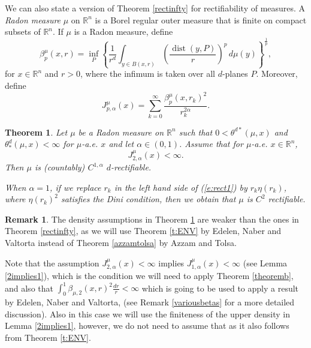 \documentclass[11pt, twoside, leqno]{article}
\numberwithin{equation}{section}
\theoremstyle{plain}
\newtheorem{thmz}{Theorem}
\theoremstyle{definition}
\newtheorem{rk}[thm]{Remark}
\newcommand{\R}{\mathbb{R}}
\newcommand{\dist}{\operatorname{dist}}
\begin{document}
We can also state a version of Theorem \ref{rectinfty} for rectifiability of measures. A \emph{Radon measure} $\mu$ on $\R^n$ is a Borel regular outer measure that is finite on compact subsets of $\R^n$.
If $\mu$ is a Radon measure, define
\begin{equation}
\beta_p^{\mu}(x,r)=\inf_P\left\{\frac{1}{r^d} \int_{y \in B(x,r)} \left(\frac{\dist(y,P)}{r}\right)^p\,d\mu(y)\right\}^{\frac{1}{p}},
\end{equation}
for $x \in \R^n$ and $r>0$, where the infimum is taken over all $d$-planes $P$.
Moreover, define
\begin{equation}
J^{\mu}_{p, \alpha}(x)= \sum_{k=0}^{\infty}\frac{\beta_p^{\mu}(x,r_k)^2}{r_k^{2\alpha}}.
\end{equation}


\begin{thmz} \label{rect1}
Let $\mu$ be a Radon measure on $\R^n$ such that $0< \theta^{d *}(\mu,x)$ and $\theta_*^d({\mu},x) <\infty$ for $\mu$-a.e. $x$ and let $\alpha\in (0,1)$. Assume that for $\mu$-a.e. $x \in \R^n$,
\begin{equation} \label{e:rect1}
J^{\mu}_{2,\alpha}(x) < \infty.
\end{equation}
Then $\mu$ is (countably) $C^{1,\alpha}$ $d$-rectifiable. 

When $\alpha=1$, if we replace $r_k$ in the left hand side of (\ref{e:rect1}) by $r_k\eta(r_k)$, where $\eta(r_k)^2$ satisfies the Dini condition, then we obtain that $\mu$ is $C^{2}$ rectifiable.
\end{thmz}

\begin{rk}
The density assumptions in Theorem \ref{rect1} are weaker than the ones in Theorem \ref{rectinfty}, as we will use Theorem \ref{t:ENV} by Edelen, Naber and Valtorta instead of Theorem \ref{azzamtolsa} by Azzam and Tolsa.

Note that the assumption $J^{\mu}_{2,\alpha}(x) < \infty$ implies $J^{\mu}_{1,\alpha}(x)< \infty$ (see Lemma \ref{2implies1}), which is the condition we will need to apply Theorem \ref{theoremb}, and also that $\int_0^1\beta_{\mu,2}(x,r)^2 \frac{dr}{r} < \infty$ which is going to be used to apply a result by Edelen, Naber and Valtorta, \cite{naber} (see Remark \ref{variousbetas} for a more detailed discussion). Also in this case we will use the finiteness of the upper density in Lemma \ref{2implies1}, however, we do not need to assume that as it also follows from Theorem \ref{t:ENV}. %
\end{rk}
\end{document}
